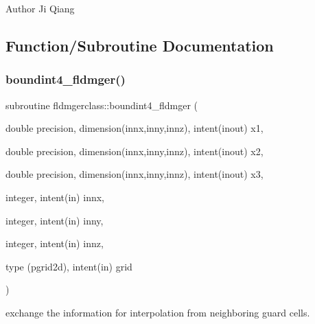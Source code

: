 \begin{DoxyAuthor}{Author}
Ji Qiang 
\end{DoxyAuthor}


\subsection{Function/\+Subroutine Documentation}
\mbox{\label{namespacefldmgerclass_a490fceb1792fb1664488b1394dcff5f0}} 
\subsubsection{\texorpdfstring{boundint4\_fldmger()}{boundint4\_fldmger()}}
{\footnotesize\ttfamily subroutine fldmgerclass\+::boundint4\+\_\+fldmger (\begin{DoxyParamCaption}\item[{double precision, dimension(innx,inny,innz), intent(inout)}]{x1,  }\item[{double precision, dimension(innx,inny,innz), intent(inout)}]{x2,  }\item[{double precision, dimension(innx,inny,innz), intent(inout)}]{x3,  }\item[{integer, intent(in)}]{innx,  }\item[{integer, intent(in)}]{inny,  }\item[{integer, intent(in)}]{innz,  }\item[{type (pgrid2d), intent(in)}]{grid }\end{DoxyParamCaption})}



exchange the information for interpolation from neighboring guard cells. 

